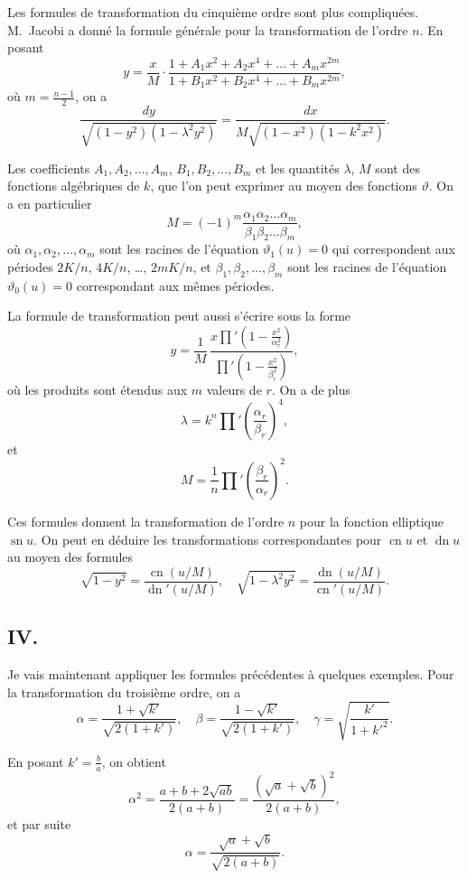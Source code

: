 \documentclass[11pt,a4paper]{article}
\DeclareMathOperator{\sn}{sn}
\DeclareMathOperator{\cn}{cn}
\DeclareMathOperator{\dn}{dn}
\begin{document}
\setcounter{page}{67}

Les formules de transformation du cinquième ordre sont plus compliquées. M.~Jacobi a donné la formule générale pour la transformation de l'ordre $n$. En posant
\[
y = \frac{x}{M} \cdot \frac{1+A_1x^2+A_2x^4+\ldots+A_mx^{2m}}{1+B_1x^2+B_2x^4+\ldots+B_mx^{2m}},
\]
où $m = \frac{n-1}{2}$, on a
\[
\frac{dy}{\sqrt{(1-y^2)(1-\lambda^2y^2)}}
= \frac{dx}{M\sqrt{(1-x^2)(1-k^2x^2)}}.
\]

Les coefficients $A_1,A_2,\ldots,A_m$, $B_1,B_2,\ldots,B_m$ et les quantités $\lambda$, $M$ sont des fonctions algébriques de $k$, que l'on peut exprimer au moyen des fonctions $\vartheta$. On a en particulier
\[
M = (-1)^m \frac{\alpha_1\alpha_2\ldots\alpha_m}{\beta_1\beta_2\ldots\beta_m},
\]
où $\alpha_1,\alpha_2,\ldots,\alpha_m$ sont les racines de l'équation $\vartheta_1(u)=0$ qui correspondent aux périodes $2K/n$, $4K/n$, \ldots, $2mK/n$, et $\beta_1,\beta_2,\ldots,\beta_m$ sont les racines de l'équation $\vartheta_0(u)=0$ correspondant aux mêmes périodes.

\setcounter{page}{68}

La formule de transformation peut aussi s'écrire sous la forme
\[
y = \frac{1}{M}\, \frac{x\prod'(1-\frac{x^2}{\alpha_r^2})}{\prod'(1-\frac{x^2}{\beta_r^2})},
\]
où les produits sont étendus aux $m$ valeurs de $r$. On a de plus
\[
\lambda = k^n \prod' \left(\frac{\alpha_r}{\beta_r}\right)^4,
\]
et
\[
M = \frac{1}{n} \prod' \left(\frac{\beta_r}{\alpha_r}\right)^2.
\]

Ces formules donnent la transformation de l'ordre $n$ pour la fonction elliptique $\sn u$. On peut en déduire les transformations correspondantes pour $\cn u$ et $\dn u$ au moyen des formules
\[
\sqrt{1-y^2} = \frac{\cn(u/M)}{\dn'(u/M)}, \quad \sqrt{1-\lambda^2y^2} = \frac{\dn(u/M)}{\cn'(u/M)}.
\]

\setcounter{page}{69}

\subsection*{IV.}

Je vais maintenant appliquer les formules précédentes à quelques exemples. Pour la transformation du troisième ordre, on a
\[
\alpha = \frac{1+\sqrt{k'}}{\sqrt{2(1+k')}}, \quad
\beta = \frac{1-\sqrt{k'}}{\sqrt{2(1+k')}}, \quad
\gamma = \sqrt{\frac{k'}{1+k'^2}}.
\]

En posant $k' = \frac{b}{a}$, on obtient
\[
\alpha^2 = \frac{a+b+2\sqrt{ab}}{2(a+b)} = \frac{(\sqrt{a}+\sqrt{b})^2}{2(a+b)},
\]
et par suite
\[
\alpha = \frac{\sqrt{a}+\sqrt{b}}{\sqrt{2(a+b)}}.
\]
\end{document}
